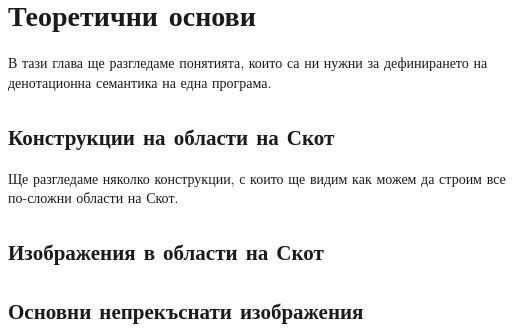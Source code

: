\chapter{Теоретични основи}


В тази глава ще разгледаме понятията, които са ни нужни за дефинирането на денотационна семантика на една програма.



\section{Конструкции на области на Скот}

Ще разгледаме няколко конструкции, с които ще видим как можем да строим все по-сложни области на Скот.





\section{Изображения в области на Скот}









\section{Основни непрекъснати изображения}











% 



% 

% 






% 
% 

\newpage
% 
% 

% 

